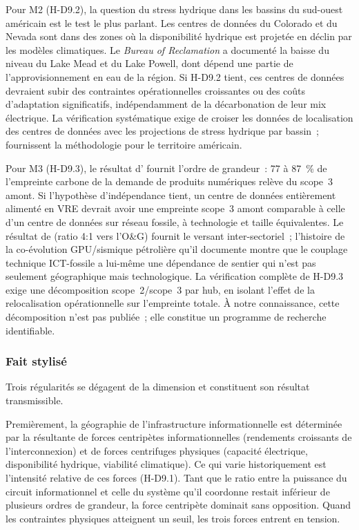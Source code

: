 Pour M2 (H-D9.2), la question du stress hydrique dans les bassins du sud-ouest américain est le test le plus parlant. Les centres de données du Colorado et du Nevada sont dans des zones où la disponibilité hydrique est projetée en déclin par les modèles climatiques. Le \emph{Bureau of Reclamation} a documenté la baisse du niveau du Lake Mead et du Lake Powell, dont dépend une partie de l'approvisionnement en eau de la région. Si H-D9.2 tient, ces centres de données devraient subir des contraintes opérationnelles croissantes ou des coûts d'adaptation significatifs, indépendamment de la décarbonation de leur mix électrique. La vérification systématique exige de croiser les données de localisation des centres de données avec les projections de stress hydrique par bassin~; \textcite{siddik_environmental_2021} fournissent la méthodologie pour le territoire américain.

Pour M3 (H-D9.3), le résultat d'\textcite{axenbeck_global_2025} fournit l'ordre de grandeur~: 77 à 87~\% de l'empreinte carbone de la demande de produits numériques relève du scope~3 amont. Si l'hypothèse d'indépendance tient, un centre de données entièrement alimenté en VRE devrait avoir une empreinte scope~3 amont comparable à celle d'un centre de données sur réseau fossile, à technologie et taille équivalentes. Le résultat de \textcite{roussilhe_counting_2026} (ratio 4:1 vers l'O\&G) fournit le versant inter-sectoriel~; l'histoire de la co-évolution GPU/sismique pétrolière qu'il documente montre que le couplage technique ICT-fossile a lui-même une dépendance de sentier qui n'est pas seulement géographique mais technologique. La vérification complète de H-D9.3 exige une décomposition scope~2/scope~3 par hub, en isolant l'effet de la relocalisation opérationnelle sur l'empreinte totale. À notre connaissance, cette décomposition n'est pas publiée~; elle constitue un programme de recherche identifiable.


\subsubsection{Fait stylisé}

Trois régularités se dégagent de la dimension et constituent son résultat transmissible.

Premièrement, la géographie de l'infrastructure informationnelle est déterminée par la résultante de forces centripètes informationnelles (rendements croissants de l'interconnexion) et de forces centrifuges physiques (capacité électrique, disponibilité hydrique, viabilité climatique). Ce qui varie historiquement est l'intensité relative de ces forces (H-D9.1). Tant que le ratio entre la puissance du circuit informationnel et celle du système qu'il coordonne restait inférieur de plusieurs ordres de grandeur, la force centripète dominait sans opposition. Quand les contraintes physiques atteignent un seuil, les trois forces entrent en tension.

